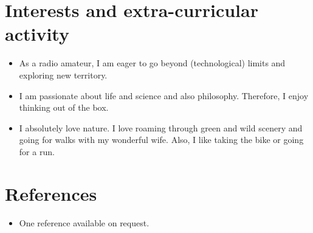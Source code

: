 \documentclass[11pt,a4paper,sans]{moderncv}        %
\begin{document}
\section{Interests and extra-curricular activity}

\vspace{6pt}

\begin{itemize}

\item{As a radio amateur, I am eager to go beyond (technological) limits and exploring new territory.}

\vspace{6pt}

\item{I am passionate about life and science and also philosophy. Therefore, I enjoy thinking out of the box.}

\vspace{6pt}

\item{I absolutely love nature. I love roaming through green and wild scenery and going for walks with my wonderful wife. Also, I like taking the bike or going for a run.}

\end{itemize}

\section{References}

\vspace{6pt}
 
\begin{itemize}

\item{One reference available on request.}

\end{itemize}

\nocite{*}



\end{document}
